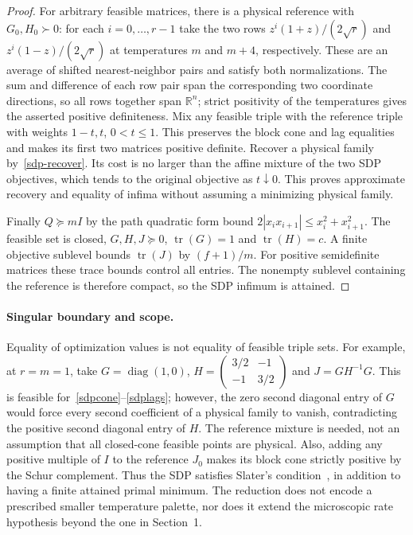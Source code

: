 \documentclass[11pt]{article}
\newcommand{\R}{\mathbb R}
\begin{document}
\begin{proof}
For arbitrary feasible matrices, there is a physical reference with $G_0,H_0\succ0$: for each $i=0,\ldots,r-1$ take the two rows $z^i(1+z)/(2\sqrt r)$ and $z^i(1-z)/(2\sqrt r)$ at temperatures $m$ and $m+4$, respectively. These are an average of shifted nearest-neighbor pairs and satisfy both normalizations. The sum and difference of each row pair span the corresponding two coordinate directions, so all rows together span $\R^n$; strict positivity of the temperatures gives the asserted positive definiteness. Mix any feasible triple with the reference triple with weights $1-t,t$, $0<t\le1$. This preserves the block cone and lag equalities and makes its first two matrices positive definite. Recover a physical family by~\eqref{sdp-recover}. Its cost is no larger than the affine mixture of the two SDP objectives, which tends to the original objective as $t\downarrow0$. This proves approximate recovery and equality of infima without assuming a minimizing physical family.

Finally $Q\succeq mI$ by the path quadratic form bound $2|x_ix_{i+1}|\le x_i^2+x_{i+1}^2$. The feasible set is closed, $G,H,J\succeq0$, $\operatorname{tr}(G)=1$ and $\operatorname{tr}(H)=c$. A finite objective sublevel bounds $\operatorname{tr}(J)$ by $(f+1)/m$. For positive semidefinite matrices these trace bounds control all entries. The nonempty sublevel containing the reference is therefore compact, so the SDP infimum is attained.
\end{proof}

\paragraph{Singular boundary and scope.}
Equality of optimization values is not equality of feasible triple sets. For example, at $r=m=1$, take $G=\operatorname{diag}(1,0)$, $H=\left(\begin{smallmatrix}3/2&-1\\-1&3/2\end{smallmatrix}\right)$ and $J=GH^{-1}G$. This is feasible for~\eqref{sdpcone}--\eqref{sdplags}; however, the zero second diagonal entry of $G$ would force every second coefficient of a physical family to vanish, contradicting the positive second diagonal entry of $H$. The reference mixture is needed, not an assumption that all closed-cone feasible points are physical. Also, adding any positive multiple of $I$ to the reference $J_0$ makes its block cone strictly positive by the Schur complement. Thus the SDP satisfies Slater's condition~\cite[Sec.~5.2.3]{boyd}, in addition to having a finite attained primal minimum. The reduction does not encode a prescribed smaller temperature palette, nor does it extend the microscopic rate hypothesis beyond the one in Section~1.
\end{document}
